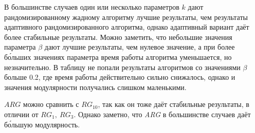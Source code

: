В большинстве случаев один или несколько параметров $k$ дают рандомизированному жадному алгоритму лучшие результаты, чем результаты адаптивного рандомизированного алгоритма, однако адаптивный вариант даёт более стабильные результаты. Можно заметить, что небольшие значения параметра $\beta$ дают лучшие результаты, чем нулевое значение, а при более б\'{о}льших значениях параметра время работы алгоритма уменьшается, но незначительно. В таблицу не попали результаты алгоритмов со значениями $\beta$ больше 0.2, где время работы действительно сильно снижалось, однако и значения модулярности получались слишком маленькими.

$ARG$ можно сравнить с $RG_{10}$, так как он тоже даёт стабильные результаты, в отличии от $RG_{1},\ RG_{3}$. Однако заметно, что \emph{ARG} в большинстве случаев даёт б\'{о}льшую модулярность.
